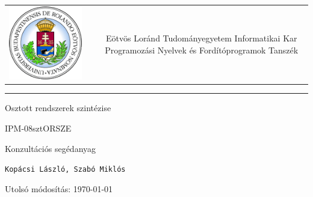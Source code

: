 \documentclass[12pt]{article}
\begin{document}
	
	
	
	\begin{titlepage}
		\vspace*{0cm}
		\centering
		\begin{tabular}{cp{1cm}c}
			\begin{minipage}{4cm}
				\vspace{0pt}
				\includegraphics[width=1\textwidth]{elte_cimer}
			\end{minipage} & &
			\begin{minipage}{7cm}
				\vspace{0pt}Eötvös Loránd Tudományegyetem \vspace{10pt} \newline
				Informatikai Kar \vspace{10pt} \newline
				Programozási Nyelvek és Fordítóprogramok Tanszék
			\end{minipage}
		\end{tabular}
		
		\vspace*{0.2cm}
		\rule{\textwidth}{1pt}
		
		\vspace*{3cm}
		{\Huge Osztott rendszerek szintézise }
		
		\vspace*{0.5cm}
		{\normalsize IPM-08sztORSZE}
		
		\vspace{2cm}
		{\huge Konzultációs segédanyag}
		
		\vspace*{5cm}
		
		{\large \verb|Kopácsi László, Szabó Miklós|}
		
		\vfill
		
		\vspace*{1cm}
		Utolsó módosítás: \today
	\end{titlepage}
	
\end{document}

